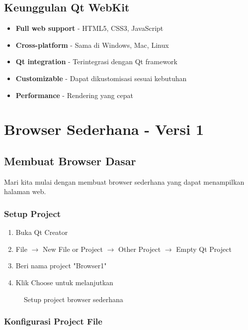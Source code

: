 \subsection{Keunggulan Qt WebKit}

\begin{itemize}
\item \textbf{Full web support} - HTML5, CSS3, JavaScript
\item \textbf{Cross-platform} - Sama di Windows, Mac, Linux
\item \textbf{Qt integration} - Terintegrasi dengan Qt framework
\item \textbf{Customizable} - Dapat dikustomisasi sesuai kebutuhan
\item \textbf{Performance} - Rendering yang cepat
\end{itemize}

\section{Browser Sederhana - Versi 1}

\subsection{Membuat Browser Dasar}

Mari kita mulai dengan membuat browser sederhana yang dapat menampilkan halaman web.

\subsubsection{Setup Project}

\begin{enumerate}
\item Buka Qt Creator
\item File $\rightarrow$ New File or Project $\rightarrow$ Other Project $\rightarrow$ Empty Qt Project
\item Beri nama project "Browser1"
\item Klik Choose untuk melanjutkan
\end{enumerate}

\begin{figure}[htbp]
\centering
{}
\caption{Setup project browser sederhana}
\end{figure}

\subsubsection{Konfigurasi Project File}

